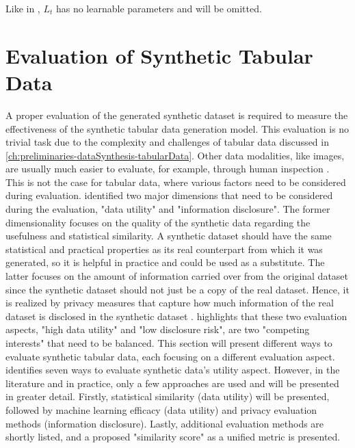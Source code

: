 Like in \cite{ho2020DenoisingDiffusionProbabilistic}, $L_{t}$ has no learnable parameters and will be omitted.


\section{Evaluation of Synthetic Tabular Data}
\label{ch:preliminaries-evaluationOfSyntheticTabularData}

A proper evaluation of the generated synthetic dataset is required to measure the effectiveness of the synthetic tabular data generation model.
This evaluation is no trivial task due to the complexity and challenges of tabular data discussed in \autoref{ch:preliminaries-dataSynthesis-tabularData}.
Other data modalities, like images, are usually much easier to evaluate, for example, through human inspection \cite{chundawat2022UniversalMetricRobust}. 
This is not the case for tabular data, where various factors need to be considered during evaluation.
\textcite[p. 6]{goncalves2020GenerationEvaluationSynthetic} identified two major dimensions that need to be considered during the evaluation, "data utility" and "information disclosure".
The former dimensionality focuses on the quality of the synthetic data regarding the usefulness and statistical similarity.
A synthetic dataset should have the same statistical and practical properties as its real counterpart from which it was generated, so it is helpful in practice and could be used as a substitute.
The latter focuses on the amount of information carried over from the original dataset since the synthetic dataset should not just be a copy of the real dataset.
Hence, it is realized by privacy measures that capture how much information of the real dataset is disclosed in the synthetic dataset \cite{goncalves2020GenerationEvaluationSynthetic}.
\textcite[p. 2]{little2021GenerativeAdversarialNetworksa} highlights that these two evaluation aspects, "high data utility" and "low disclosure risk", are two "competing interests" that need to be balanced.
This section will present different ways to evaluate synthetic tabular data, each focusing on a different evaluation aspect.
\cite{elemam2020SevenWaysEvaluate} identifies seven ways to evaluate synthetic data's utility aspect.
However, in the literature and in practice, only a few approaches are used and will be presented in greater detail.
Firstly, statistical similarity (data utility) will be presented, followed by machine learning efficacy (data utility) and privacy evaluation methods (information disclosure).
Lastly, additional evaluation methods are shortly listed, and a proposed "similarity score" as a unified metric is presented.

